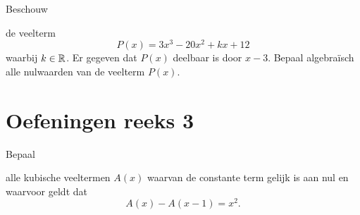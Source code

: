 \documentclass{ximera}
\begin{document}
\begin{exercise} 
\hypertarget{oef4.8}{Beschouw} de veelterm
\[
P(x) = 3x^3-20x^2+kx+12
\]
waarbij $k \in \mathbb{R}$. Er gegeven dat $P(x)$ deelbaar is door $x-3$. Bepaal algebra\"isch alle nulwaarden van de veelterm $P(x)$.
\end{exercise} 

\section*{Oefeningen reeks 3}

\begin{exercise} 
\hypertarget{oef4.9}{Bepaal} alle kubische veeltermen $A(x)$ waarvan de constante term gelijk is aan nul en waarvoor geldt dat
\[
A(x) - A(x-1) = x^2.
\]
\end{exercise} 
\end{document}
